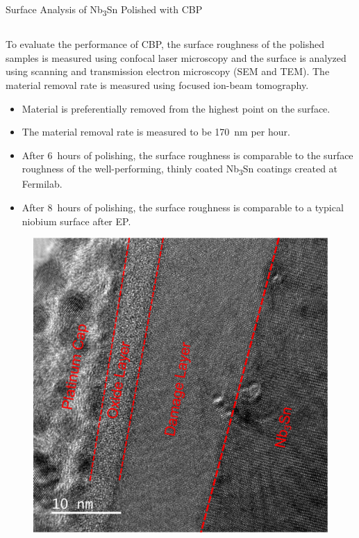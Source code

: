 \documentclass{beamer}
\begin{document}
\begin{frame}{}
\begin{columns}[t]
\begin{column}{0.32\linewidth}
\begin{block}{\label{sec:samplestudy}Surface Analysis of Nb\textsubscript{3}Sn Polished with CBP}
\begin{columns}[t]
                    \end{columns}
                    To evaluate the performance of CBP, the surface roughness of the polished samples is measured using confocal laser microscopy and the surface is analyzed using scanning and transmission electron microscopy (SEM and TEM). The material removal rate is measured using focused ion-beam tomography.
                    \begin{itemize}                        
                        \item Material is preferentially removed from the highest point on the surface.
                        \item The material removal rate is measured to be 170~nm per hour.
                        \item After 6~hours of polishing, the surface roughness is comparable to the surface roughness of the well-performing, thinly coated Nb\textsubscript{3}Sn coatings created at Fermilab\cite{posen2021advances}.
                        \item After 8~hours of polishing, the surface roughness is comparable to a typical niobium surface after EP.
                    \end{itemize}
                    \begin{figure}
                        \begin{columns}
                            \includegraphics[width=\textwidth]{../doc/figs/Sample_Surface_Damage_Layer.png}

\end{columns}
\end{figure}
\end{block}
\end{column}
\end{columns}
\end{frame}
\end{document}
